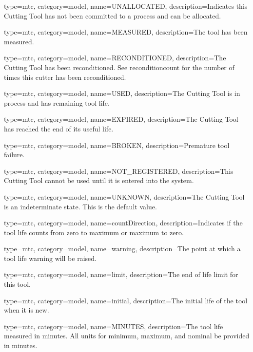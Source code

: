 {
  type=mtc,
  category=model,
  name={UNALLOCATED},
  description={Indicates this Cutting Tool has not been committed to a process and can be allocated.}
}


{
  type=mtc,
  category=model,
  name={MEASURED},
  description={The tool has been measured.}
}


{
  type=mtc,
  category=model,
  name={RECONDITIONED},
  description={The Cutting Tool has been reconditioned. See \gls{reconditioncount} for the number of times this cutter has been reconditioned.}
}


{
  type=mtc,
  category=model,
  name={USED},
  description={The Cutting Tool is in process and has remaining tool life.}
}


{
  type=mtc,
  category=model,
  name={EXPIRED},
  description={The Cutting Tool has reached the end of its useful life.}
}


{
  type=mtc,
  category=model,
  name={BROKEN},
  description={Premature tool failure.}
}


{
  type=mtc,
  category=model,
  name={NOT\_REGISTERED},
  description={This Cutting Tool cannot be used until it is entered into the system.}
}


{
  type=mtc,
  category=model,
  name={UNKNOWN},
  description={The Cutting Tool is an indeterminate state. This is the default value.}
}


{
  type=mtc,
  category=model,
  name={countDirection},
  description={Indicates if the tool life counts from zero to maximum or maximum to zero.}
}


{
  type=mtc,
  category=model,
  name={warning},
  description={The point at which a tool life warning will be raised.}
}


{
  type=mtc,
  category=model,
  name={limit},
  description={The end of life limit for this tool.}
}


{
  type=mtc,
  category=model,
  name={initial},
  description={The initial life of the tool when it is new.}
}


{
  type=mtc,
  category=model,
  name={MINUTES},
  description={The tool life measured in minutes. All units for minimum, maximum, and nominal \MUST be provided in minutes.}
}


